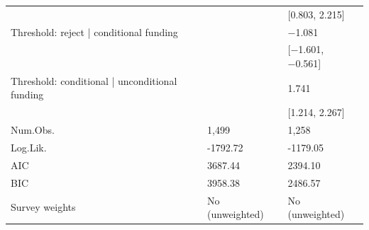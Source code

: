\begin{tabular}{lll}
&  & [\num{0.803}, \num{2.215}] \\
Threshold: reject | conditional funding &  & \num{-1.081} \\
&  & [\num{-1.601}, \num{-0.561}] \\
Threshold: conditional | unconditional funding &  & \num{1.741} \\
&  & [\num{1.214}, \num{2.267}] \\
Num.Obs. & 1,499 & 1,258 \\
Log.Lik. & -1792.72 & -1179.05 \\
AIC & 3687.44 & 2394.10 \\
BIC & 3958.38 & 2486.57 \\
Survey weights & No (unweighted) & No (unweighted) \\
\end{tabular}
